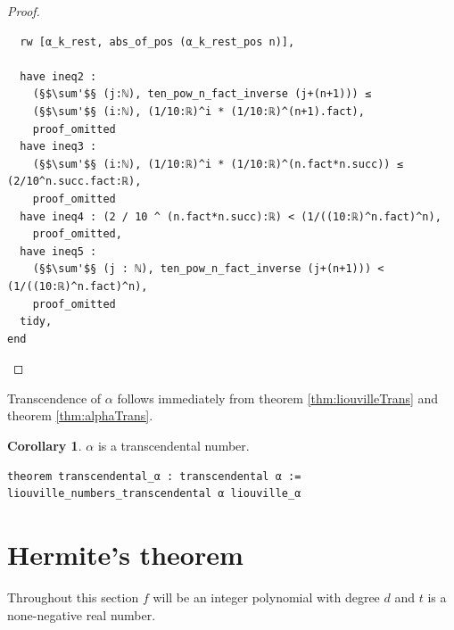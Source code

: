 \documentclass{report}
\theoremstyle{definition}
\newtheorem{lemma}{Lemma}[section]
\newtheorem{corollary}{Corollary}[section]
\begin{document}
\begin{proof}
\begin{verbatim}
  rw [α_k_rest, abs_of_pos (α_k_rest_pos n)],

  have ineq2 : 
    (§$\sum'$§ (j:ℕ), ten_pow_n_fact_inverse (j+(n+1))) ≤ 
    (§$\sum'$§ (i:ℕ), (1/10:ℝ)^i * (1/10:ℝ)^(n+1).fact),
    proof_omitted
  have ineq3 : 
    (§$\sum'$§ (i:ℕ), (1/10:ℝ)^i * (1/10:ℝ)^(n.fact*n.succ)) ≤ (2/10^n.succ.fact:ℝ),
    proof_omitted
  have ineq4 : (2 / 10 ^ (n.fact*n.succ):ℝ) < (1/((10:ℝ)^n.fact)^n),
    proof_omitted,
  have ineq5 : 
    (§$\sum'$§ (j : ℕ), ten_pow_n_fact_inverse (j+(n+1))) < (1/((10:ℝ)^n.fact)^n),
    proof_omitted
  tidy,
end
\end{verbatim}
\end{proof}

Transcendence of $\alpha$ follows immediately from theorem \ref{thm:liouvilleTrans} and theorem \ref{thm:alphaTrans}.
\begin{corollary}
$\alpha$ is a transcendental number.

\begin{verbatim}
theorem transcendental_α : transcendental α := liouville_numbers_transcendental α liouville_α 
\end{verbatim}
\end{corollary}

\section{Hermite's theorem}\label{fmlsn:e}
Throughout this section $f$ will be an integer polynomial with degree $d$ and $t$ is a none-negative real number.


\end{document}
